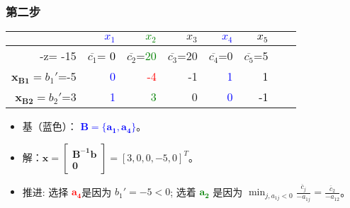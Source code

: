 	\subsubsection{第二步}
		\begin{table}[h]
		\centering
\begin{tabular}{r|rrrrrrr}\hline
  & \textcolor{blue}{$x_1$} & \textcolor{green}{$x_2$} & $x_3$ & \textcolor{blue}{$x_4$} & \textcolor{black}{$x_5$} \\
\hline
 -z= -15 & $\overline{c_1}$= \textcolor{black}{0}  & $\overline{c_2}$=\textcolor{green}{20} & $\overline{c_3}$=20 & $\overline{c_4}$=0 & $\overline{c_5}$=5  \\
 \hline
 $\mathbf{x_{B1}} = b_1'$=-5& \textcolor{blue}{0} & \textcolor{red}{-4}   & -1 & \textcolor{blue}{1} & \textcolor{black}{1}  \\
 $\mathbf{x_{B2}} = b_2'$=3 & \textcolor{blue}{1} & \textcolor{green}{3} & 0  & \textcolor{blue}{0} & \textcolor{black}{-1}  \\
\hline
\end{tabular}
\end{table}
	\begin{itemize}
		\item 基（蓝色）： \textcolor{blue}{ $\mathbf{B =\{a_1, a_4 \} }$}。
		\item 解：$\mathbf{x=\left[\begin{array}{c}\mathbf{B^{-1}b}\\\mathbf{0}\end{array}\right]}= [ 3, 0, 0, -5, 0 ]^T$。
		\item 推进: 选择 \textcolor{red}{$\mathbf{a_4}$}是因为 $b_1' = -5  < 0$; 选着 \textcolor{green}{$\mathbf{a_2}$}  是因为 $\min_{j, a_{1j}<0} \frac{\overline{c}_j }{-a_{1j} } = \frac{ \overline{c}_2 }{-a_{12} }$。
	\end{itemize}
